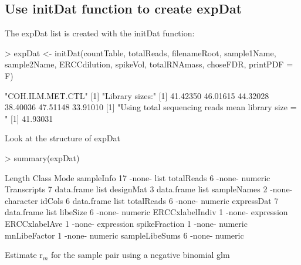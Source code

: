 \documentclass{article}
\begin{document}
\subsection{Use initDat function to create expDat}
The expDat list is created with the initDat function:
\begin{Schunk}
\begin{Sinput}
> expDat <- initDat(countTable, totalReads, filenameRoot, sample1Name,
                    sample2Name, ERCCdilution, spikeVol, totalRNAmass, choseFDR,
                    printPDF = F)
\end{Sinput}
\begin{Soutput}
[1] "COH.ILM.MET.CTL"
[1] "Library sizes:"
[1] 41.42350 46.01615 44.32028 38.40036 47.51148 33.91010
[1] "Using total sequencing reads mean library size = "
[1] 41.93031
\end{Soutput}
\end{Schunk}
Look at the structure of expDat
\begin{Schunk}
\begin{Sinput}
> summary(expDat)
\end{Sinput}
\begin{Soutput}
                Length Class      Mode      
sampleInfo      17     -none-     list      
totalReads       6     -none-     numeric   
Transcripts      7     data.frame list      
designMat        3     data.frame list      
sampleNames      2     -none-     character 
idCols           6     data.frame list      
totalReads       6     -none-     numeric   
expressDat       7     data.frame list      
libeSize         6     -none-     numeric   
ERCCxlabelIndiv  1     -none-     expression
ERCCxlabelAve    1     -none-     expression
spikeFraction    1     -none-     numeric   
mnLibeFactor     1     -none-     numeric   
sampleLibeSums   6     -none-     numeric   
\end{Soutput}
\end{Schunk}
Estimate r$_m$ for the sample pair using a negative binomial glm
\end{document}
